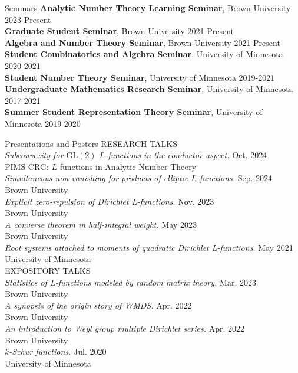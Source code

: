 \documentclass{resume} %
\begin{document}
\begin{rSection}{Seminars}
    {\bf Analytic Number Theory Learning Seminar}, Brown University \hfill {2023-Present} \\
    {\bf Graduate Student Seminar}, Brown University \hfill {2021-Present} \\
    {\bf Algebra and Number Theory Seminar}, Brown University \hfill {2021-Present} \\
    {\bf Student Combinatorics and Algebra Seminar}, University of Minnesota \hfill {2020-2021} \\
    {\bf Student Number Theory Seminar}, University of Minnesota \hfill {2019-2021} \\
    {\bf Undergraduate Mathematics Research Seminar}, University of Minnesota \hfill {2017-2021} \\
    {\bf Summer Student Representation Theory Seminar}, University of Minnesota \hfill {2019-2020} \\
\end{rSection}

\begin{rSection}{Presentations and Posters}
    RESEARCH TALKS \\
    {\em Subconvexity for $\mathrm{GL}(2)$ $L$-functions in the conductor aspect.} \hfill {Oct. 2024} \\
    \hphantom{\quad}PIMS CRG: $L$-functions in Analytic Number Theory \\
    {\em Simultaneous non-vanishing for products of elliptic $L$-functions.} \hfill {Sep. 2024} \\
    \hphantom{\quad}Brown University \\
    {\em Explicit zero-repulsion of Dirichlet L-functions.} \hfill {Nov. 2023} \\
    \hphantom{\quad}Brown University \\
    {\em A converse theorem in half-integral weight.} \hfill {May 2023} \\
    \hphantom{\quad}Brown University \\
    {\em Root systems attached to moments of quadratic Dirichlet L-functions.} \hfill {May 2021} \\
    \hphantom{\quad}University of Minnesota \\

    EXPOSITORY TALKS \\
    {\em Statistics of L-functions modeled by random matrix theory.} \hfill {Mar. 2023} \\ 
    \hphantom{\quad}Brown University \\
    {\em A synopsis of the origin story of WMDS.} \hfill {Apr. 2022} \\
    \hphantom{\quad}Brown University \\
    {\em An introduction to Weyl group multiple Dirichlet series.} \hfill {Apr. 2022} \\
    \hphantom{\quad}Brown University \\
    {\em $k$-Schur functions.} \hfill {Jul. 2020} \\ 
    \hphantom{\quad}University of Minnesota \\
\end{rSection}
\end{document}
